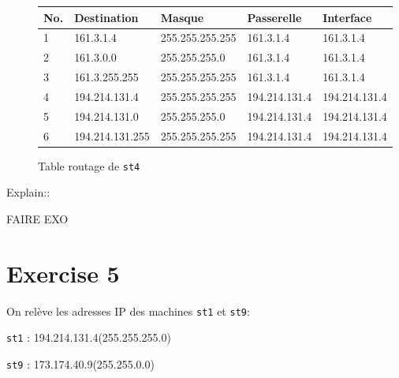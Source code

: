 \documentclass[11pt]{book}
\begin{document}
	\begin{figure}[ht!]
		\centering
		\begin{tabular}{|l|l|l|l|l|}
			\hline
			No. & Destination & Masque & Passerelle & Interface\\
			\hline
			1 & 161.3.1.4 & 255.255.255.255 & 161.3.1.4 & 161.3.1.4\\
			\hline
			2 & 161.3.0.0 & 255.255.255.0 & 161.3.1.4 & 161.3.1.4\\
			\hline
			3 & 161.3.255.255 & 255.255.255.255 & 161.3.1.4 & 161.3.1.4\\
			\hline
			4 & 194.214.131.4 & 255.255.255.255 & 194.214.131.4 & 194.214.131.4\\
			\hline
			5 & 194.214.131.0 & 255.255.255.0 & 194.214.131.4 & 194.214.131.4\\
			\hline
			6 & 194.214.131.255 & 255.255.255.255 & 194.214.131.4 & 194.214.131.4\\
			\hline
			
		\end{tabular}
		\caption{Table routage de \texttt{st4}}
	\end{figure}
	
	Explain::

	FAIRE EXO 

	\section{Exercise 5}

	On relève les adresses IP des machines \texttt{st1} et \texttt{st9}:
	\begin{items}{-15pt}{-15pt}
	\item \texttt{st1} : 194.214.131.4(255.255.255.0)
	\item \texttt{st9} : 173.174.40.9(255.255.0.0)
	\end{items}
\end{document}
